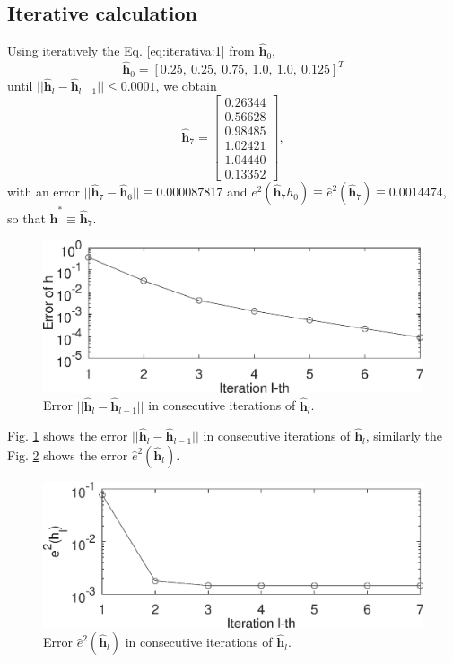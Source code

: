 \documentclass[11pt,twocolumn]{article}
\begin{document}
\subsection{Iterative calculation}

Using iteratively the Eq. \ref{eq:iterativa:1} from $\mathbf{\hat{h}}_0$,
\begin{equation}\label{eq:iterativa:h:0}
\mathbf{\hat{h}}_0=\left[0.25,~0.25,~0.75,~1.0,~1.0,~0.125\right]^{T}
\end{equation}
until $||\mathbf{\hat{h}}_{l}-\mathbf{\hat{h}}_{l-1}||\leq 0.0001$,
we obtain 
\begin{equation}\label{eq:iterativa:h:7}
\mathbf{\hat{h}}_7 = \left[
\begin{matrix}
0.26344\\
0.56628\\
0.98485\\
1.02421\\
1.04440\\ 
0.13352
\end{matrix}
\right],
\end{equation}
with an error $||\mathbf{\hat{h}}_{7}-\mathbf{\hat{h}}_{6}||\equiv 0.000087817$ 
and $e^2(\mathbf{\hat{h}}_{7} h_0)\equiv \hat{e}^2(\mathbf{\hat{h}}_{7} )\equiv 0.0014474$, 
so that $\mathbf{\hat{h}^*} \equiv \mathbf{\hat{h}}_7 $.

\begin{figure}[ht!]
\centering
\includegraphics[width=0.950\columnwidth]{errorh.eps}
\caption{Error $||\mathbf{\hat{h}}_{l}-\mathbf{\hat{h}}_{l-1}||$ in consecutive iterations of $\mathbf{\hat{h}}_{l}$.}
\label{fig:errorh}
\end{figure}

Fig. \ref{fig:errorh} shows the error  $||\mathbf{\hat{h}}_{l}-\mathbf{\hat{h}}_{l-1}||$ in consecutive iterations of $\mathbf{\hat{h}}_{l}$,
similarly the Fig. \ref{fig:error} shows the error  $\hat{e}^2(\mathbf{\hat{h}}_{l} )$.


\begin{figure}[ht!]
\centering
\includegraphics[width=0.950\columnwidth]{error.eps}
\caption{Error $\hat{e}^2(\mathbf{\hat{h}}_{l})$ in consecutive iterations of $\mathbf{\hat{h}}_{l}$.}
\label{fig:error}
\end{figure}
\end{document}
